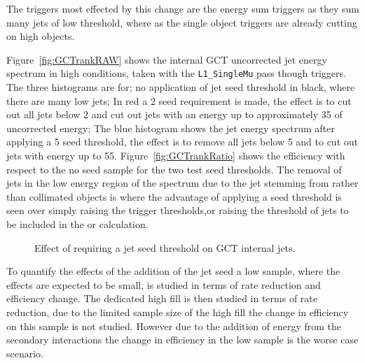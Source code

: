 The triggers most effected by this change are the energy sum triggers as they 
sum many jets of low threshold, where as the single object triggers are already 
cutting on high \ET objects.

Figure~\ref{fig:GCTrankRAW} shows the internal GCT uncorrected jet energy 
spectrum in high \pu conditions, taken with the \verb|L1_SingleMu| pass 
though triggers. The three histograms are for; no application of jet seed 
threshold in black, where there are many low \ET jets; In red a \unit{2}{\GeV} 
seed requirement is made, the effect is to cut out all jets below 
\unit{2}{\GeV} and cut out jets with an energy up to approximately 
\unit{35}{\GeV} of uncorrected energy; The blue histogram shows the jet energy 
spectrum after applying a \unit{5}{\GeV} seed threshold, the effect is to 
remove all jets below \unit{5}{\GeV} and to cut out jets with energy up to 
\unit{55}{\GeV}. Figure~\ref{fig:GCTrankRatio} shows the efficiency with 
respect to the no seed sample for the two test seed thresholds. The removal of 
jets in the low energy region of the \ET spectrum due to the jet stemming from \pu rather than collimated objects is where the advantage of applying a seed threshold is seen over simply raising the trigger thresholds,or raising the threshold of jets to be included in the \Lone \HT or \HTm calculation.


\begin{figure}[h!]
    \centering
    \caption{Effect of requiring a jet seed threshold on GCT internal jets.}
    \label{fig:GCTrank}
\end{figure}



To quantify the effects of the addition of the jet seed a low \pu sample, 
where the effects are expected to be small, is studied in terms of rate 
reduction and efficiency change. The dedicated high \pu fill is then 
studied in terms of rate reduction, due to the limited sample size of the high 
\pu fill the change in efficiency on this sample is not studied. However 
due to the addition of energy from the secondary \pu interactions the 
change in efficiency in the low \pu sample is the worse case scenario.

